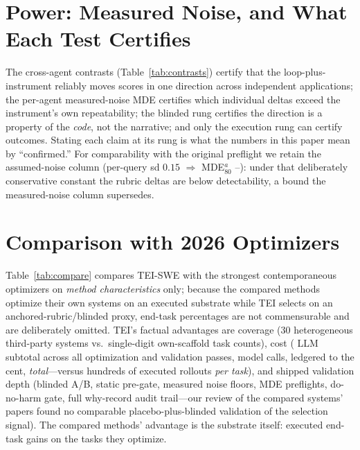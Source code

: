 \documentclass[11pt]{article}
\begin{document}
\section{Power: Measured Noise, and What Each Test Certifies}
\label{sec:power}
\MDEpowerpara

The cross-agent contrasts (Table~\ref{tab:contrasts}) certify that the
loop-plus-instrument reliably moves scores in one direction across \swN{}
independent applications; the per-agent measured-noise MDE certifies which
individual deltas exceed the instrument's own repeatability; the blinded rung
certifies the direction is a property of the \emph{code}, not the narrative;
and only the execution rung can certify outcomes. Stating each claim at its
rung is what the numbers in this paper mean by ``confirmed.'' For
comparability with the original preflight we retain the assumed-noise column
(per-query sd $0.15$ $\Rightarrow$ MDE$^{a}_{80}$
\swMDEmin--\swMDEmax): under that deliberately conservative constant the
rubric deltas are below detectability, a bound the measured-noise column
supersedes.

\section{Comparison with 2026 Optimizers}
\label{sec:compare}
Table~\ref{tab:compare} compares TEI-SWE with the strongest contemporaneous
optimizers on \emph{method characteristics} only; because the compared methods
optimize their own systems on an executed substrate while TEI selects on an
anchored-rubric/blinded proxy, end-task percentages are not commensurable and
are deliberately omitted. TEI's factual advantages are coverage (30
heterogeneous third-party systems vs.\ single-digit own-scaffold task counts),
cost (\swLLMCombined{} LLM subtotal across all optimization and validation
passes, \swCallsCanon{} model calls, ledgered to the cent, \emph{total}---versus
hundreds of executed rollouts \emph{per task}), and shipped validation depth (blinded
A/B, static pre-gate, measured noise floors, MDE preflights, do-no-harm gate,
full why-record audit trail---our review of the compared systems' papers
found no comparable placebo-plus-blinded validation of the selection signal).
The compared methods' advantage is the substrate itself: executed end-task
gains on the tasks they optimize.
\end{document}
